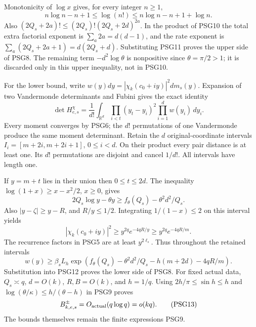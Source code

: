 \documentclass[10pt]{article}
\begin{document}
Monotonicity of \(\log x\) gives, for every integer \(n\ge1\),
\[
 n\log n-n+1\le\log(n!)\le n\log n-n+1+\log n.
 \tag{PSG11}
\]
Also \((2Q_s+2a)!\le(2Q_s)!(2Q_s+2d)^{2a}\).
In the product of PSG10 the total extra factorial exponent is
\(\sum_a2a=d(d-1)\), and the rate exponent is
\(\sum_a(2Q_s+2a+1)=d(2Q_s+d)\). Substituting PSG11 proves
the upper side of PSG8. The remaining term \(-d^2\log\theta\)
is nonpositive since \(\theta=\pi/2>1\); it is discarded only
in this upper inequality, not in PSG10.

For the lower bound, write
\(w(y)dy=|\chi_k(c_0+iy)|^2dm_s(y)\). Expansion of two
Vandermonde determinants and Fubini gives the exact identity
\[
 \det H^\chi_{e,s}
  =\frac1{d!}\int_{\mathbb R^d}
       \prod_{i<t}(y_t-y_i)^2\prod_{i=1}^d w(y_i)\,dy_i .
 \tag{PSG12}
\]
Every moment converges by PSG6; the \(d!\) permutations of one
Vandermonde produce the same moment determinant.
Retain the \(d\) original-coordinate intervals
\(I_i=[m+2i,m+2i+1]\), \(0\le i<d\). On their product every
pair distance is at least one. Its \(d!\) permutations are
disjoint and cancel \(1/d!\). All intervals have length one.

If \(y=m+t\) lies in their union then \(0\le t\le2d\).
The inequality \(\log(1+x)\ge x-x^2/2\), \(x\ge0\), gives
\[
 2Q_s\log y-\theta y\ge f_\theta(Q_s)-\theta^2d^2/Q_s.
\]
Also \(|y-\zeta|\ge y-R\), and \(R/y\le1/2\).
Integrating \(1/(1-x)\le2\) on this interval yields
\[
 |\chi_k(c_0+iy)|^2
       \ge y^{2q}e^{-4qR/y}\ge y^{2q}e^{-4qR/m}.
\]
The recurrence factors in PSG5 are at least \(y^{2\ell_s}\).
Thus throughout the retained intervals
\[
 w(y)\ge\beta_s L_h\exp\left(
 f_\theta(Q_s)-\theta^2d^2/Q_s-h(m+2d)-4qR/m\right).
\]
Substitution into PSG12 proves the lower side of PSG8.
For fixed actual data, \(Q_s\asymp q\), \(d=O(k)\),
\(R,B=O(k)\), and \(h=1/q\). Using
\(2h/\pi\le\sin h\le h\) and
\(\log(\theta/\kappa)\le h/(\theta-h)\) in PSG9 proves
\[
 B^\pm_{k,e,s}=O_{\rm actual}(q\log q)=o(kq).
 \tag{PSG13}
\]
The bounds themselves remain the finite expressions PSG9.
\end{document}
